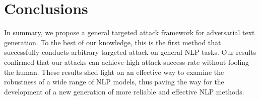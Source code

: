 \section{Conclusions}
In summary, we propose a general targeted attack framework for adversarial text generation. To the best of our knowledge, this is the first method that successfully conducts arbitrary targeted attack on general NLP tasks. %
Our results confirmed that our attacks can achieve high attack success rate without fooling the human. 
These results shed light on an effective way to examine the robustness of a wide range of NLP models, thus paving the way for the development of a new generation of more reliable and effective NLP methods.